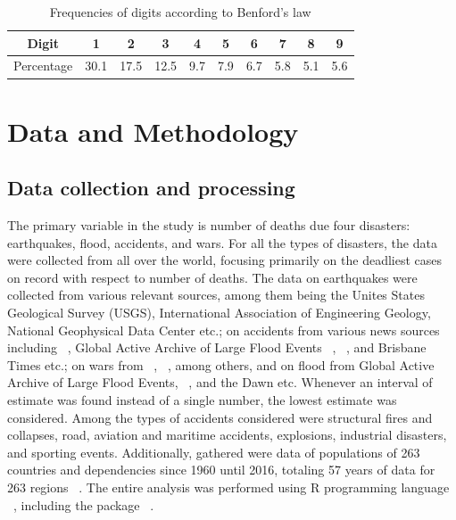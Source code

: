 \begin{table}
\begin{center}
\caption{Frequencies of digits according to Benford's law}
\label{exp_freq}
\begin{tabular}{|c| c |c| c| c| c| c| c| c| c|} 
\hline

Digit&1&2&3&4&5&6&7&8&9\\
\hline

Percentage&30.1 &17.5&12.5&9.7&7.9&6.7&5.8&5.1&5.6\\
\hline
\end{tabular}
\end{center}
\end{table}

\section{Data and Methodology}

\subsection{Data collection and processing  }
The primary variable in the study is number of deaths due four disasters: earthquakes, flood, accidents, and wars. For all the types of disasters, the data were collected from all over the world, focusing primarily on the deadliest cases on record with respect to number of deaths. The data on earthquakes were collected from various relevant sources, among them being the Unites States Geological Survey (USGS), International Association of Engineering Geology, National Geophysical Data Center etc.; on accidents from various news sources including ~\citet{BBC:hope}, Global Active Archive of Large Flood Events ~\citep{Brakenridge}, ~\citet{Age}, and Brisbane Times etc.; on wars from 
~\citet{nash}, ~\citet{Age}, among others, and on flood from Global Active Archive of Large Flood Events, ~\citet{Worldometers}, and the Dawn etc. Whenever an interval of estimate was found instead of a single number, the lowest estimate was considered. Among the types of accidents considered were structural fires and collapses, road, aviation and maritime accidents, explosions, industrial disasters, and sporting events. Additionally, gathered were data of populations of 263 countries and dependencies since 1960 until 2016, totaling 57 years of data for 263 regions ~\citet{seh}. The entire analysis was performed using R programming language ~\citep{R}, including the  package ~\citep{tidyverse}. 

